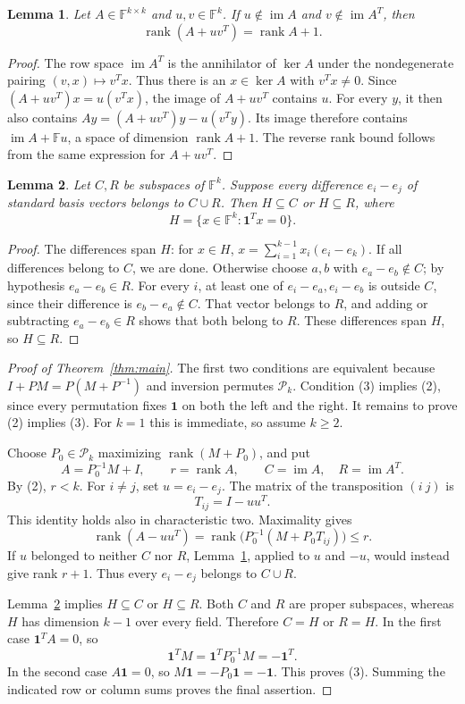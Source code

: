 \documentclass[11pt]{article}
\newtheorem{lemma}{Lemma}
\newcommand{\F}{\mathbb F}
\newcommand{\im}{\operatorname{im}}
\newcommand{\rank}{\operatorname{rank}}
\begin{document}
\begin{lemma}\label{lem:update}
Let $A\in\F^{k\times k}$ and $u,v\in\F^k$. If
$u\notin\im A$ and $v\notin\im A^T$, then
\[
 \rank(A+uv^T)=\rank A+1.
\]
\end{lemma}
\begin{proof}
The row space $\im A^T$ is the annihilator of $\ker A$ under the
nondegenerate pairing $(v,x)\mapsto v^Tx$. Thus there is an
$x\in\ker A$ with $v^Tx\ne0$. Since $(A+uv^T)x=u(v^Tx)$,
the image of $A+uv^T$ contains $u$. For every $y$, it then also contains
$Ay=(A+uv^T)y-u(v^Ty)$. Its image therefore contains
$\im A+\F u$, a space of dimension $\rank A+1$.
The reverse rank bound follows from the same expression for $A+uv^T$.
\end{proof}

\begin{lemma}\label{lem:roots}
Let $C,R$ be subspaces of $\F^k$. Suppose every difference
$e_i-e_j$ of standard basis vectors belongs to $C\cup R$.
Then $H\subseteq C$ or $H\subseteq R$, where
\[
 H=\{x\in\F^k:\mathbf1^Tx=0\}.
\]
\end{lemma}
\begin{proof}
The differences span $H$: for $x\in H$,
$x=\sum_{i=1}^{k-1}x_i(e_i-e_k)$. If all differences belong to $C$,
we are done. Otherwise choose $a,b$ with $e_a-e_b\notin C$;
by hypothesis $e_a-e_b\in R$. For every $i$, at least one of
$e_i-e_a,e_i-e_b$ is outside $C$, since their difference is
$e_b-e_a\notin C$. That vector belongs to $R$, and adding or
subtracting $e_a-e_b\in R$ shows that both belong to $R$.
These differences span $H$, so $H\subseteq R$.
\end{proof}

\begin{proof}[Proof of Theorem~\ref{thm:main}]
The first two conditions are equivalent because
$I+PM=P(M+P^{-1})$ and inversion permutes $\mathcal P_k$.
Condition (3) implies (2), since every permutation fixes $\mathbf1$
on both the left and the right. It remains to prove (2) implies (3).
For $k=1$ this is immediate, so assume $k\geq2$.

Choose $P_0\in\mathcal P_k$ maximizing $\rank(M+P_0)$, and put
\[
 A=P_0^{-1}M+I,\qquad r=\rank A,\qquad
 C=\im A,\quad R=\im A^T.
\]
By (2), $r<k$. For $i\ne j$, set $u=e_i-e_j$. The matrix of
the transposition $(i\ j)$ is
\[
 T_{ij}=I-uu^T.
\]
This identity holds also in characteristic two. Maximality gives
\[
 \rank(A-uu^T)
 =\rank\bigl(P_0^{-1}(M+P_0T_{ij})\bigr)\leq r.
\]
If $u$ belonged to neither $C$ nor $R$, Lemma~\ref{lem:update},
applied to $u$ and $-u$, would instead give rank $r+1$.
Thus every $e_i-e_j$ belongs to $C\cup R$.

Lemma~\ref{lem:roots} implies $H\subseteq C$ or $H\subseteq R$.
Both $C$ and $R$ are proper subspaces, whereas $H$ has dimension
$k-1$ over every field. Therefore $C=H$ or $R=H$.
In the first case $\mathbf1^TA=0$, so
\[
 \mathbf1^TM=\mathbf1^TP_0^{-1}M=-\mathbf1^T.
\]
In the second case $A\mathbf1=0$, so
$M\mathbf1=-P_0\mathbf1=-\mathbf1$.
This proves (3). Summing the indicated row or column sums proves
the final assertion.
\end{proof}
\end{document}
